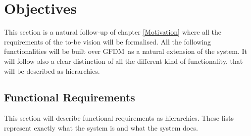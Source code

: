 \documentclass[12pt,a4paper]{report}
\newcommand\systemName{GFDM}
\begin{document}
\chapter{Objectives}
This section is a natural follow-up of chapter \ref{Motivation} where all the requirements of the to-be vision will be formalised.
%
All the following functionalities will be built over \systemName\, as a natural extension of the system.
%
It will follow also a clear distinction of all the different kind of functionality, that will be described as hierarchies.

\section{Functional Requirements} \label{Functional Requirements}
This section will describe functional requirements as hierarchies.
%
These lists represent exactly what the system is and what the system does.
%
\end{document}
